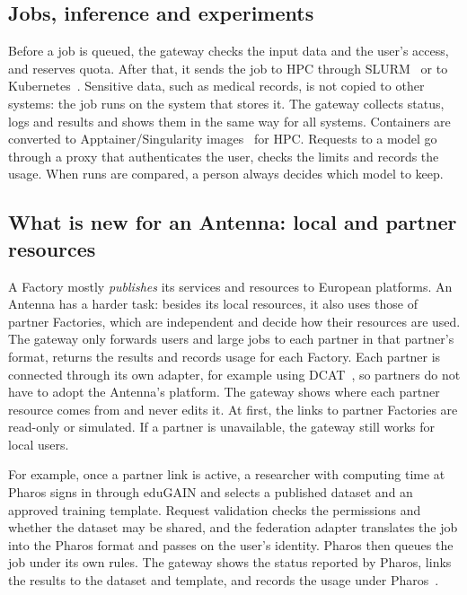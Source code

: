 \documentclass[conference,a4paper]{IEEEtran}
\DeclareRobustCommand{\roz}[1]{#1}
\DeclareRobustCommand{\nov}[1]{#1}
\DeclareRobustCommand{\tri}[1]{#1}
\DeclareRobustCommand{\fin}[1]{#1}
\begin{document}
\subsection{Jobs, inference and experiments}
Before a job \roz{is queued}, the gateway checks the input data and the user's access, and reserves quota. \roz{After that,} it sends the job to HPC through SLURM~\cite{yoo2003slurm} or to Kubernetes~\cite{burns2016borg}. \nov{\tri{Sensitive data, such as medical records, is not copied to other systems: the job runs on the system that stores it.}} The gateway collects status, logs and results and shows them in the same way for all systems. \roz{Containers} are converted to Apptainer/Singularity images~\cite{kurtzer2017singularity} for HPC. \nov{Requests to a model go through a proxy that authenticates the user, checks the limits and records the usage.} \roz{When runs are compared,} a person always decides which model to keep.

\subsection{\nov{What is new for an Antenna: local and partner resources}}
A Factory mostly \emph{publishes} its services and resources to European platforms. \nov{\tri{An Antenna has a harder task: besides its local resources, it also uses those of partner Factories, which are independent and decide how their resources are used.} \tri{The gateway only forwards users and large jobs to each partner in that partner's format, returns the results and records usage for each Factory.}} Each partner is connected through its own adapter, for example using DCAT~\cite{w3c_dcat3}\nov{, so partners do not have to adopt the Antenna's platform}. \roz{The gateway shows where each partner resource comes from and never edits it. At first, the links to partner Factories are read-only or simulated. If a partner is unavailable, the gateway still works for local users.}

\fin{For example, once a partner link is active, a researcher with computing time at Pharos signs in through eduGAIN and selects a published dataset and an approved training template. Request validation checks the permissions and whether the dataset may be shared, and the federation adapter translates the job into the Pharos format and passes on the user's identity. Pharos then queues the job under its own rules. The gateway shows the status reported by Pharos, links the results to the dataset and template, and records the usage under Pharos~\cite{saifa_d31}.}
\end{document}
